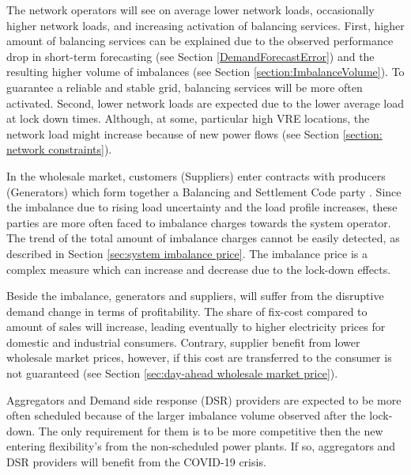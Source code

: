 \documentclass[energies,article,submit,moreauthors,pdftex]{Definitions/mdpi}
\begin{document}
The network operators will see on average lower network loads, occasionally higher network loads, and increasing activation of balancing services. First, higher amount of balancing services can be explained due to the observed performance drop in short-term forecasting (see Section \ref{DemandForecastError}) and the resulting higher volume of imbalances (see Section \ref{section:ImbalanceVolume}). To guarantee a reliable and stable grid, balancing services will be more often activated. Second, lower network loads are expected due to the lower average load at lock down times. Although, at some, particular high VRE locations, the network load might increase because of new power flows (see Section \ref{section: network constraints}).

In the wholesale market, customers (Suppliers) enter contracts with producers (Generators) which form together a Balancing and Settlement Code party \cite{ELEXON2019GuidanceBritain}. Since the imbalance due to rising load uncertainty and the load profile increases, these parties are more often faced to imbalance charges towards the system operator. The trend of the total amount of imbalance charges cannot be easily detected, as described in Section \ref{sec:system imbalance price}. The imbalance price is a complex measure which can increase and decrease due to the lock-down effects. 

Beside the imbalance, generators and suppliers, will suffer from the disruptive demand change in terms of profitability. The share of fix-cost compared to amount of sales will increase, leading eventually to higher electricity prices for domestic and industrial consumers. Contrary, supplier benefit from lower wholesale market prices, however, if this cost are transferred to the consumer is not guaranteed (see Section \ref{sec:day-ahead wholesale market price}).

Aggregators and Demand side response (DSR) providers are expected to be more often scheduled because of the larger imbalance volume observed after the lock-down. The only requirement for them is to be more competitive then the new entering flexibility's from the non-scheduled power plants. If so, aggregators and DSR providers will benefit from the COVID-19 crisis.
\end{document}
